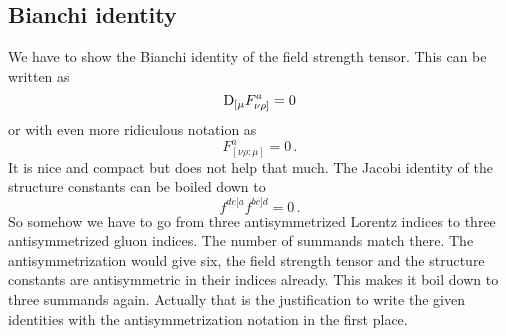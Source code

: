 \documentclass[11pt, english, fleqn, DIV=15, headinclude]{scrartcl}
\begin{document}
\subsection{Bianchi identity}

We have to show the Bianchi identity of the field strength tensor. This can be
written as
\[
    \mathop{}\!\mathrm D_{[\mu} F^a_{\nu\rho]} = 0
\]
or with even more ridiculous notation as
\[
    F^a_{[\nu\rho;\mu]} = 0 \,.
\]
It is nice and compact but does not help that much. The Jacobi identity of the
structure constants can be boiled down to
\[
    f^{de[a} f^{bc]d} = 0 \,.
\]
So somehow we have to go from three antisymmetrized Lorentz indices to three
antisymmetrized gluon indices. The number of summands match there. The
antisymmetrization would give six, the field strength tensor and the structure
constants are antisymmetric in their indices already. This makes it boil down
to three summands again. Actually that is the justification to write the given
identities with the antisymmetrization notation in the first place.
\end{document}
